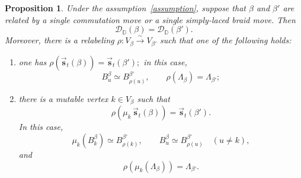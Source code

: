 \documentclass[12pt, reqno]{amsart}
\theoremstyle{plain}
\newtheorem{proposition}[theorem]{Proposition}
\theoremstyle{definition}
\numberwithin{equation}{section}
\newcommand{\DD}{\mathbb{D}}
\begin{document}
\begin{proposition}\label{lem:mutation-right-inductive-seed}
Under the assumption~\ref{assumption}, suppose that \(\beta\) and \(\beta'\)
are related by a single commutation move or a single simply-laced
braid move. Then
\begin{equation}\label{eq:braid-move-category-equality}
    \mathscr D_{\DD}(\beta)
    =
    \mathscr D_{\DD}(\beta').
\end{equation}
Moreover, there is a relabeling
\(
    \rho\colon V_\beta\xrightarrow{\sim}V_{\beta'}
\)
such that one of the following holds:
\begin{enumerate}
\item one has
\(
    \rho\!\left(
        \overrightarrow{\mathbf s}_t(\beta)
    \right)
    =
    \overrightarrow{\mathbf s}_t(\beta');
\)
in this case,
\[
    B_u^\beta\simeq B_{\rho(u)}^{\beta'},
    \qquad
    \rho(\Lambda_\beta)=\Lambda_{\beta'};
\]
\item there is a mutable vertex \(k\in V_\beta\) such that
\begin{equation}\label{eq:braid-move-quantum-seed}
    \rho\!\left(
        \mu_k\,
        \overrightarrow{\mathbf s}_t(\beta)
    \right)
    =
    \overrightarrow{\mathbf s}_t(\beta').
\end{equation}
In this case,
\[
    \mu_k(B_k^\beta)
    \simeq
    B_{\rho(k)}^{\beta'},
    \qquad
    B_u^\beta
    \simeq
    B_{\rho(u)}^{\beta'}
    \quad(u\neq k),
\]
and
\begin{equation}\label{eq:braid-move-compatible-form}
    \rho\!\left(
        \mu_k(\Lambda_\beta)
    \right)
    =
    \Lambda_{\beta'}.
\end{equation}
\end{enumerate}
\end{proposition}
\end{document}

